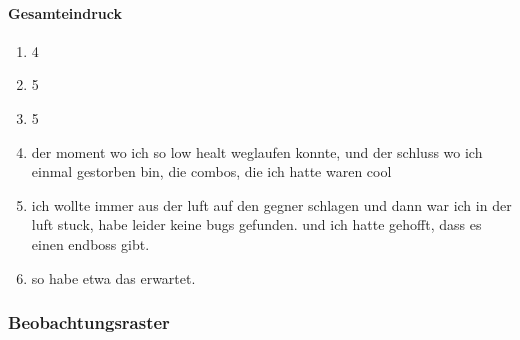 \documentclass[../Main.tex]{subfiles}
\begin{document}
\paragraph{Gesamteindruck}
\begin{enumerate}[label=\textbf{Q\arabic*}, leftmargin=1.5cm, itemsep=0.5em, resume]
    \item 4
    \item 5
    \item 5
    \item der moment wo ich so low healt weglaufen konnte, und der schluss wo ich einmal gestorben bin, die combos, die ich hatte waren cool
    \item ich wollte immer aus der luft auf den gegner schlagen und dann war ich in der luft stuck, habe leider keine bugs gefunden. und ich hatte gehofft, dass es einen endboss gibt.
    \item so habe etwa das erwartet.
\end{enumerate}

\subsubsection{Beobachtungsraster}
\end{document}
